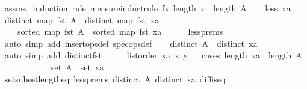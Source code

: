 \begin{isabellebody}
%
\endisadelimproof
%
\isatagproof
{}\isamarkupfalse%
\ assms\ \isamarkupfalse%
{\isacharparenleft}induction\ rule{\isacharcolon}\ measure{\isacharunderscore}induct{\isacharunderscore}rule{\isacharbrackleft}\ f{\isacharequal}{\isachardoublequoteopen}{\isasymlambda}x{\isachardot}\ {\isacharparenleft}length\ x\ {\isacharminus}\ length\ A{\isacharparenright}{\isachardoublequoteclose}{\isacharbrackright}{\isacharparenright}\isanewline
\ \ \isamarkupfalse%
\ {\isacharparenleft}less\ xa{\isacharparenright}\isanewline
\ \ \isamarkupfalse%
\ {\isachardoublequoteopen}distinct\ {\isacharparenleft}map\ fst\ A{\isacharparenright}{\isachardoublequoteclose}\ \ {\isachardoublequoteopen}distinct\ {\isacharparenleft}map\ fst\ xa{\isacharparenright}{\isachardoublequoteclose}\ \isanewline
\ \ \ \ {\isachardoublequoteopen}sorted\ {\isacharparenleft}map\ fst\ A{\isacharparenright}{\isachardoublequoteclose}\ \ {\isachardoublequoteopen}sorted\ {\isacharparenleft}map\ fst\ xa{\isacharparenright}{\isachardoublequoteclose}\isanewline
\ \ \ \ \isamarkupfalse%
\ less{\isachardot}prems\ \isamarkupfalse%
\ {\isacharparenleft}auto\ simp\ add{\isacharcolon}\ insert{\isacharunderscore}ops{\isacharunderscore}def\ spec{\isacharunderscore}ops{\isacharunderscore}def{\isacharparenright}\isanewline
\ \ \isamarkupfalse%
\ {\isachardoublequoteopen}distinct\ A{\isachardoublequoteclose}\ \ {\isachardoublequoteopen}distinct\ xa{\isachardoublequoteclose}\isanewline
\ \ \ \ \isamarkupfalse%
\ {\isacharparenleft}auto\ simp\ add{\isacharcolon}\ distinct{\isacharunderscore}fst{\isacharparenright}\isanewline
\ \ \isamarkupfalse%
\ \isamarkupfalse%
\ {\isachardoublequoteopen}list{\isacharunderscore}order\ xa\ x\ y{\isachardoublequoteclose}\isanewline
\ \ \isamarkupfalse%
{\isacharparenleft}cases\ {\isachardoublequoteopen}length\ xa\ {\isacharminus}\ length\ A{\isachardoublequoteclose}{\isacharparenright}\isanewline
\ \ \ \ \isamarkupfalse%
\ {}\isanewline
\ \ \ \ \isamarkupfalse%
\ {\isachardoublequoteopen}set\ A\ {\isacharequal}\ set\ xa{\isachardoublequoteclose}\isanewline
\ \ \ \ \ \ \isamarkupfalse%
\ set{\isacharunderscore}subset{\isacharunderscore}length{\isacharunderscore}eq\ less{\isachardot}prems{\isacharparenleft}{}{\isacharparenright}\ {\isacartoucheopen}distinct\ A{\isacartoucheclose}\ {\isacartoucheopen}distinct\ xa{\isacartoucheclose}\ diff{\isacharunderscore}is{\isacharunderscore}{}{\isacharunderscore}eq\ \isamarkupfalse%

\end{isabellebody}
